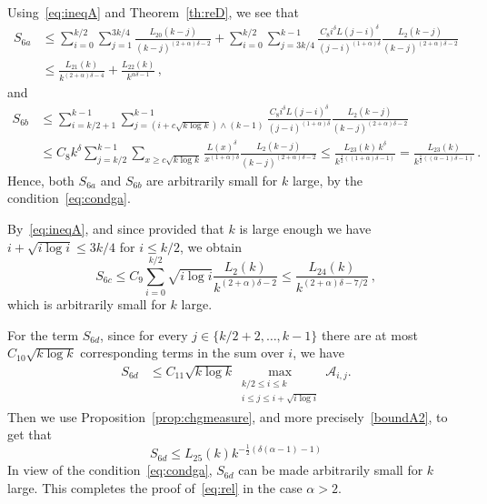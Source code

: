 \documentclass[10pt]{amsart}
\theoremstyle{definition}\newtheorem{defi}[theo]{Definition}\newtheorem{rema}[theo]{Remark}\newtheorem{exam}[theo]{Example}\newtheorem{exem}[theo]{Example}\newtheorem{nota}[theo]{Notation}
\newcommand{\ga}{\alpha}
\newcommand{\gd}{\delta}
\newcommand{\cA}{\ensuremath{\mathcal{A}}}
\newcommand{\maxtwo}[2]{\max_{\substack{#1 \\ #2}}}
\begin{document}
Using~\eqref{eq:ineqA} and Theorem~\ref{th:reD}, we see that
\begin{equation}
\begin{split}
S_{6a} & \le \sum_{i=0}^{ k/2 } \sum_{j= 1}^{ 3k/4} \frac{L_{20}(k-j)}{(k-j)^{(2+\ga)\delta -2}} + \sum_{i=0}^{k/2 } \sum_{j= 3k/4}^{k-1} \frac{C_8 i^{\gd} L(j-i)^{\gd}}{(j-i)^{(1+\ga) \delta}} \frac{L_{2}(k-j)}{(k-j)^{(2+\ga)\delta -2}} \\
& \le \frac{L_{21}(k)}{k^{(2+\ga)\delta -4}} + \frac{L_{22}(k)}{k^{\ga \delta -1}}\,,
\end{split}
\end{equation}
and
\begin{align*}
S_{6b} &\le \sum_{i= k/2 +1}^{k-1} \sum_{j=(i +c\sqrt{k\log k}) \wedge (k-1)}^{k-1} \frac{C_8 i^{\gd} L(j-i)^{\gd}}{(j-i)^{(1+\ga) \delta}} \frac{L_{2}(k-j)}{(k-j)^{(2+\ga)\delta -2}} \\
&\le C_8 k^{\gd} \sum_{j=k/2}^{k-1} \sum_{x\geq c \sqrt{k\log k}} \frac{L(x)^{\gd}}{ x^{(1+\ga) \gd}} \frac{L_{2}(k-j)}{(k-j)^{(2+\ga)\delta -2}} \leq \frac{L_{23}(k)\,k^{\gd}}{ k^{\tfrac12 ((1+\ga)\gd-1)}} = \frac{L_{23}(k)}{ k^{\tfrac12((\ga-1)\gd-1)}}\,.
\end{align*}
Hence, both $S_{6a}$ and $S_{6b}$ are arbitrarily small for $k$ large, by the condition~\eqref{eq:condga}.

By~\eqref{eq:ineqA}, and since provided that $k$ is large enough we have $i+\sqrt{i\log i}\leq 3k/4$ for $i\leq k/2$, we obtain
\begin{equation}
S_{6c} \le C_9 \sum_{i=0}^{ k/2 } \sqrt{i\log i} \frac{L_{2}(k)}{k^{(2+\ga)\delta -2}} \le \frac{L_{24}(k)}{ k^{(2+\ga)\delta - 7/2 } }\,,
\end{equation}
which is arbitrarily small for $k$ large.

For the term $S_{6d}$, since for every $j\in \{k/2+2,\ldots, k-1\}$ there are at most $C_{10} \sqrt{k\log k}$ corresponding terms in the sum over $i$, we have
\begin{align}\label{eq:S6d}
S_{6d} & \le C_{11} \sqrt{k\log k} \maxtwo{ k/2 \le i \le k}{i \le j \le i+ \sqrt{i \log i} } \cA_{i,j}.
\end{align}
Then we use Proposition~\ref{prop:chgmeasure}, and more precisely~\eqref{boundA2}, to get that
\begin{equation}
S_{6d} \le L_{25}(k) k^{- \frac12 (\gd (\ga-1)-1)}
\end{equation}
In view of the condition~\eqref{eq:condga}, $S_{6d}$ can be made arbitrarily small for $k$ large. This completes the proof of~\eqref{eq:rel} in the case $\ga>2$.
\end{document}

